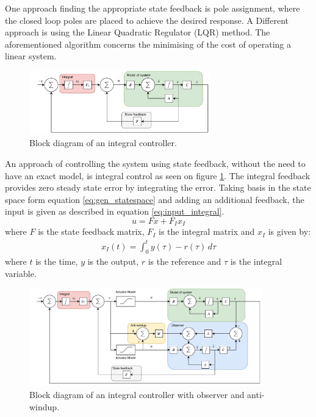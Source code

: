 \documentclass[../../main.tex]{subfiles}
\begin{document}
One approach finding the appropriate state feedback is pole assignment, where the closed loop poles are placed to achieve the desired response. A Different approach is using the Linear Quadratic Regulator (LQR) method. The aforementioned algorithm concerns the minimising of the cost of operating a linear system. 

\begin{figure}
    \centering
    \includegraphics[width=0.7\textwidth]{Sections/Miscellaneous/Images/Statefeedback_Integral.pdf}
    \caption{Block diagram of an integral controller.}
    \label{fig:Integral_Diagram}
\end{figure}

An approach of controlling the system using state feedback, without the need to have an exact model, is integral control as seen on figure \ref{fig:Integral_Diagram}. The integral feedback provides zero steady state error by integrating the error. Taking basis in the state space form equation \ref{eq:gen_statespace} and adding an additional feedback, the input is given as described in equation \ref{eq:input_integral}.
\begin{equation}\label{eq:input_integral}
    u=Fx+F_Ix_I
\end{equation}
where $F$ is the state feedback matrix, $F_I$ is the integral matrix and $x_I$ is given by:
\begin{equation}
    \begin{split}
        x_I(t)=\int_0^t y(\tau)-r(\tau)\,d\tau
    \end{split}
\end{equation}
where $t$ is the time, $y$ is the output, $r$ is the reference and $\tau$ is the integral variable.

\begin{figure}
    \centering
    \includegraphics[width=0.9\textwidth]{Sections/Miscellaneous/Images/Anti_Windup_Integral_Observer.pdf}
    \caption{Block diagram of an integral controller with observer and anti-windup.}
    \label{fig:Integral_Observer_Diagram}
\end{figure}
\end{document}
